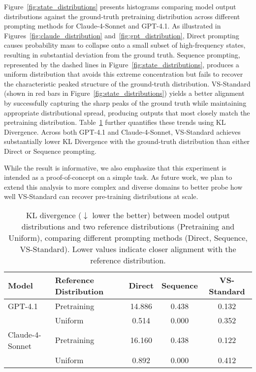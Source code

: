 Figure~\ref{fig:state_distributions} presents histograms comparing model output distributions against the ground-truth pretraining distribution across different prompting methods for Claude-4-Sonnet and GPT-4.1. 
As illustrated in Figures~\ref{fig:claude_distribution} and~\ref{fig:gpt_distribution}, Direct prompting causes probability mass to collapse onto a small subset of high-frequency states, resulting in substantial deviation from the ground truth. 
Sequence prompting, represented by the dashed lines in Figure~\ref{fig:state_distributions}, produces a uniform distribution that avoids this extreme concentration but fails to recover the characteristic peaked structure of the ground-truth distribution.
VS-Standard (shown in red bars in Figure~\ref{fig:state_distributions}) yields a better alignment by successfully capturing the sharp peaks of the ground truth while maintaining appropriate distributional spread, producing outputs that most closely match the pretraining distribution.
Table~\ref{tab:pre_training_data_kl_divergence} further quantifies these trends using KL Divergence. Across both GPT-4.1 and Claude-4-Sonnet, VS-Standard achieves substantially lower KL Divergence with the ground-truth distribution than either Direct or Sequence prompting.

While the result is informative, we also emphasize that this experiment is intended as a proof-of-concept on a simple task. As future work, we plan to extend this analysis to more complex and diverse domains to better probe how well VS-Standard can recover pre-training distributions at scale.

\begin{table}[!htbp]
\centering
\caption{KL divergence ($\downarrow$ lower the better) between model output distributions and two reference distributions (Pretraining and Uniform), comparing different prompting methods (Direct, Sequence, VS-Standard). Lower values indicate closer alignment with the reference distribution.}
\label{tab:pre_training_data_kl_divergence}
\begin{tabular}{l l c c c}
\toprule
\textbf{Model} & \textbf{Reference Distribution} & \textbf{Direct} & \textbf{Sequence} & \textbf{VS-Standard} \\
\midrule
GPT-4.1 & Pretraining & 14.886 & 0.438 & 0.132 \\
       & Uniform      & 0.514 & 0.000 & 0.352 \\
\midrule
Claude-4-Sonnet & Pretraining & 16.160 & 0.438 & 0.122 \\
       & Uniform      & 0.892 & 0.000 & 0.412\\
\bottomrule
\end{tabular}
\end{table}

